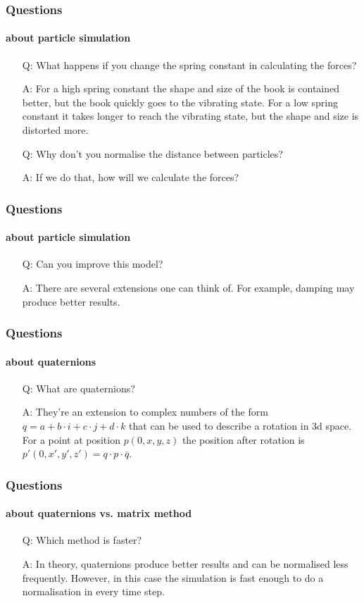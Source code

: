 \documentclass{beamer}
\begin{document}
 \begin{frame}
  \frametitle{Questions}
  \framesubtitle{about particle simulation}
  \begin{itemize}
   \item[Q:] What happens if you change the spring constant in calculating the forces?
   \item[A:] For a high spring constant the shape and size of the book is contained better, but the book quickly goes to the vibrating state. For a low spring constant it takes longer to reach the vibrating state, but the shape and size is distorted more.
   \item[Q:] Why don't you normalise the distance between particles?
   \item[A:] If we do that, how will we calculate the forces?
  \end{itemize}
 \end{frame}

 \begin{frame}
  \frametitle{Questions}
  \framesubtitle{about particle simulation}
  \begin{itemize}
   \item[Q:] Can you improve this model?
   \item[A:] There are several extensions one can think of. For example, damping may produce better results.
  \end{itemize}
 \end{frame}

 \begin{frame}
  \frametitle{Questions}
  \framesubtitle{about quaternions}
  \begin{itemize}
   \item[Q:] What are quaternions?
   \item[A:] They're an extension to complex numbers of the form $q = a + b \cdot i + c \cdot j + d \cdot k$ that can be used to describe a rotation in 3d space. For a point at position $p(0,x,y,z)$ the position after rotation is $p'(0,x',y',z') = q \cdot p \cdot \overline{q}$.
  \end{itemize}
 \end{frame}

 \begin{frame}
  \frametitle{Questions}
  \framesubtitle{about quaternions vs. matrix method}
  \begin{itemize}
   \item[Q:] Which method is faster?
   \item[A:] In theory, quaternions produce better results and can be normalised less frequently. However, in this case the simulation is fast enough to do a normalisation in every time step.
  \end{itemize}
 \end{frame}
\end{document}
